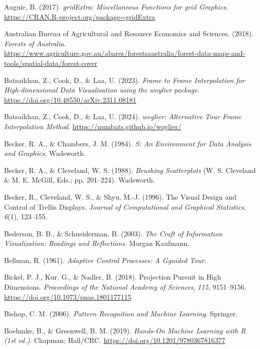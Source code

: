 \documentclass[
  letterpaper,
]{krantz}
\newlength{\cslhangindent}
\newenvironment{CSLReferences}[2] %
 {\begin{list}{}{%
  \setlength{\itemindent}{0pt}
  \setlength{\leftmargin}{0pt}
  \setlength{\parsep}{0pt}
  \ifodd #1
   \setlength{\leftmargin}{\cslhangindent}
   \setlength{\itemindent}{-1\cslhangindent}
  \fi
  \setlength{\itemsep}{#2\baselineskip}}}
 {\end{list}}
\begin{document}
\begin{CSLReferences}{1}{0}
Auguie, B. (2017). \emph{{gridExtra}: {M}iscellaneous {F}unctions for
{grid} {G}raphics}. \url{https://CRAN.R-project.org/package=gridExtra}

Australian Bureau of Agricultural and Resource Economics and Sciences.
(2018). \emph{{Forests of Australia}}.
\url{https://www.agriculture.gov.au/abares/forestsaustralia/forest-data-maps-and-tools/spatial-data/forest-cover}

Batsaikhan, Z., Cook, D., \& Laa, U. (2023). \emph{Frame to {F}rame
{I}nterpolation for {H}igh-dimensional {D}ata {V}isualisation using the
{woylier} package}. \url{https://doi.org/10.48550/arXiv.2311.08181}

Batsaikhan, Z., Cook, D., \& Laa, U. (2024). \emph{{woylier}:
{A}lternative {T}our {F}rame {I}nterpolation {M}ethod}.
\url{https://numbats.github.io/woylier/}

Becker, R. A., \& Chambers, J. M. (1984). \emph{{S}: {A}n {E}nvironment
for {D}ata {A}nalysis and {G}raphics}. Wadsworth.

Becker, R. A., \& Cleveland, W. S. (1988). \emph{{B}rushing
{S}catterplots} (W. S. Cleveland \& M. E. McGill, Eds.; pp. 201--224).
Wadsworth.

Becker, R., Cleveland, W. S., \& Shyu, M.-J. (1996). {T}he {V}isual
{D}esign and {C}ontrol of {T}rellis {D}isplays. \emph{Journal of
Computational and Graphical Statistics}, \emph{6}(1), 123--155.

Bederson, B. B., \& Schneiderman, B. (2003). \emph{The {C}raft of
{I}nformation {V}isualization: {R}eadings and {R}eflections}. Morgan
Kaufmann.

Bellman, R. (1961). \emph{Adaptive {C}ontrol {P}rocesses: {A} {G}guided
{T}our}.

Bickel, P. J., Kur, G., \& Nadler, B. (2018). Projection {P}ursuit in
{H}igh {D}imensions. \emph{Proceedings of the National Academy of
Sciences}, \emph{115}, 9151--9156.
\url{https://doi.org/10.1073/pnas.1801177115}

Bishop, C. M. (2006). \emph{Pattern {R}ecognition and {M}achine
{L}earning}. Springer.

Boehmke, B., \& Greenwell, B. M. (2019). \emph{Hands-{O}n {M}achine
{L}earning with {R} (1st ed.)}. Chapman; Hall/CRC.
\url{https://doi.org/10.1201/9780367816377}


\end{CSLReferences}
\end{document}
